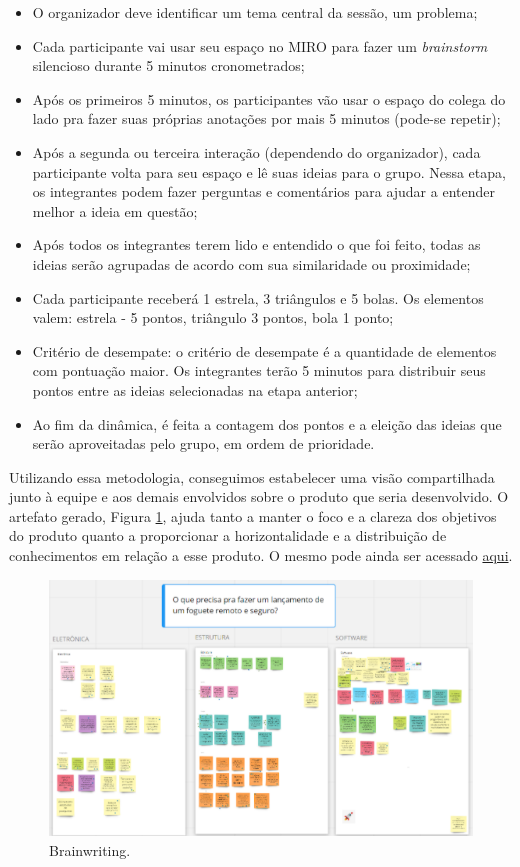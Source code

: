 \begin{itemize}
\item O organizador deve identificar um tema central da sessão, um problema;
\item Cada participante vai usar seu espaço no MIRO para fazer um \textit{brainstorm} silencioso durante 5 minutos cronometrados;
\item Após os primeiros 5 minutos, os participantes vão usar o espaço do colega do lado pra fazer suas próprias anotações por mais 5 minutos (pode-se repetir);
\item Após a segunda ou terceira interação (dependendo do organizador), cada participante volta para seu espaço e lê suas ideias para o grupo. Nessa etapa, os integrantes podem fazer perguntas e comentários para ajudar a entender melhor a ideia em questão;
\item Após todos os integrantes terem lido e entendido o que foi feito, todas as ideias serão agrupadas de acordo com sua similaridade ou proximidade;
\item Cada participante receberá 1 estrela, 3 triângulos e 5 bolas. Os elementos valem: estrela - 5 pontos, triângulo 3 pontos, bola 1 ponto;
\item Critério de desempate: o critério de desempate é a quantidade de elementos com pontuação maior. Os integrantes terão 5 minutos para distribuir seus pontos entre as ideias selecionadas na etapa anterior;
\item Ao fim da dinâmica, é feita a contagem dos pontos e a eleição das ideias que serão aproveitadas pelo grupo, em ordem de prioridade.
\end{itemize}

\par Utilizando essa metodologia, conseguimos estabelecer uma visão compartilhada junto à equipe e aos demais envolvidos sobre o produto que seria desenvolvido. O artefato gerado, Figura \ref{fig:miro}, ajuda tanto a manter o foco e a clareza dos objetivos do produto quanto a proporcionar a horizontalidade e a distribuição de conhecimentos em relação a esse produto. O mesmo pode ainda ser acessado \href{https://miro.com/app/board/o9J_kmVCAxA=/}{aqui}.

\begin{figure}[H]
\centering
\includegraphics[scale=0.8]{figuras/miro.png}  
\caption{Brainwriting.}
\label{fig:miro}
\end{figure}

